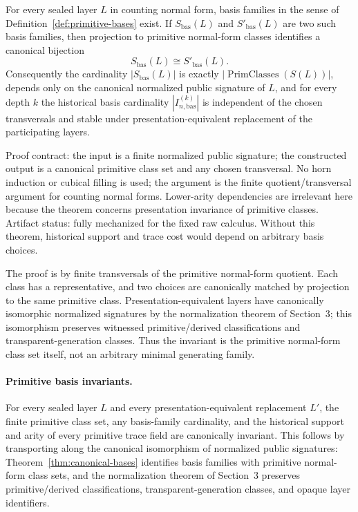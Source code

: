 \documentclass{lmcs}
\begin{document}
\begin{thm}
\label{thm:canonical-bases}
For every sealed layer \(L\) in counting normal form, basis families in the sense of
Definition~\ref{def:primitive-bases} exist.  If \(S_{\mathrm{bas}}(L)\) and
\(S'_{\mathrm{bas}}(L)\) are two such basis
families, then projection to primitive normal-form classes identifies a canonical bijection
\[
  S_{\mathrm{bas}}(L) \cong S'_{\mathrm{bas}}(L).
\]
Consequently the cardinality \(|S_{\mathrm{bas}}(L)|\) is exactly
\(|\operatorname{PrimClasses}(S(L))|\), depends only on the canonical normalized public
signature of \(L\), and for every depth \(k\) the historical basis cardinality
\(|I_{n,\mathrm{bas}}^{(k)}|\) is independent of the chosen transversals and stable under
presentation-equivalent replacement of the participating layers.

Proof contract: the input is a finite normalized public signature; the
constructed output is a canonical primitive class set and any chosen
transversal.  No horn induction or cubical filling is used; the argument is the
finite quotient/transversal argument for counting normal forms.  Lower-arity
dependencies are irrelevant here because the theorem concerns presentation
invariance of primitive classes.  Artifact status: fully mechanized for the
fixed raw calculus.  Without this theorem, historical support and trace cost
would depend on arbitrary basis choices.
\end{thm}

The proof is by finite transversals of the primitive normal-form quotient.  Each class has a
representative, and two choices are canonically matched by projection to the same primitive
class.  Presentation-equivalent layers have canonically isomorphic normalized signatures by
the normalization theorem of Section~3; this isomorphism preserves witnessed primitive/derived
classifications and transparent-generation classes.  Thus the invariant is the primitive
normal-form class set itself, not an arbitrary minimal generating family.

\paragraph{Primitive basis invariants.}
For every sealed layer \(L\) and every presentation-equivalent replacement \(L'\), the finite
primitive class set, any basis-family cardinality, and the historical support and arity of every
primitive trace field are canonically invariant.  This follows by transporting along the
canonical isomorphism of normalized public signatures: Theorem~\ref{thm:canonical-bases}
identifies basis families with primitive normal-form class sets, and the normalization theorem
of Section~3 preserves primitive/derived classifications, transparent-generation classes, and
opaque layer identifiers.
\end{document}
